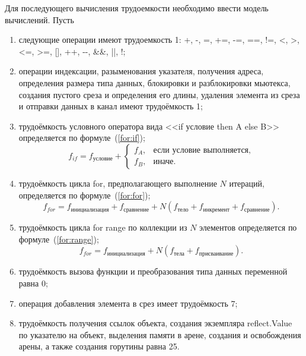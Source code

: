 Для последующего вычисления трудоемкости необходимо ввести модель вычислений. Пусть
\begin{enumerate}[label*=\arabic*)]
	\item следующие операции имеют трудоемкость 1: +, -, =, +=, -=, ==, !=, <, >, <=, >=, [], ++, {-}-, \&\&, ||, !;
	
	\item операции индексации, разыменования указателя, получения адреса, определения размера типа данных, блокировки и разблокировки мьютекса, создания пустого среза и определения его длины, удаления элемента из среза и отправки данных в канал имеют трудоёмкость 1;
	
	\item трудоёмкость условного оператора вида <<if условие then A else B>> определяется по формуле~(\ref{for:if});
	\begin{equation}
		\label{for:if}
		f_{if} = f_{\text{условие}} +
		\begin{cases}
			f_A, & \text{если условие выполняется,}\\
			f_B, & \text{иначе.}
		\end{cases}
	\end{equation}
	
	\item трудоёмкость цикла for, предполагающего выполнение $N$ итераций, определяется по формуле~(\ref{for:for});
	\begin{equation}
		\label{for:for}
		f_{for} = f_{\text{инициализация}} + f_{\text{сравнение}} + N(f_{\text{тело}} + f_{\text{инкремент}} + f_{\text{сравнение}}).
	\end{equation}
	
	\item трудоёмкость цикла for range по коллекции из $N$ элементов определяется по формуле~(\ref{for:range});
	\begin{equation}
		\label{for:range}
		f_{for} = f_{\text{инициализация}} + N(f_{\text{тела}} + f_{\text{присваивание}}).
	\end{equation}
	
	\item трудоёмкость вызова функции и преобразования типа данных переменной равна 0;
	
	\item операция добавления элемента в срез имеет трудоёмкость 7;
	
	\item трудоёмкость получения ссылок объекта, создания экземпляра reflect.Value~\cite{golang_reflect} по указателю на объект, выделения памяти в арене, создания и освобождения арены, а также создания горутины равна 25.
\end{enumerate}



